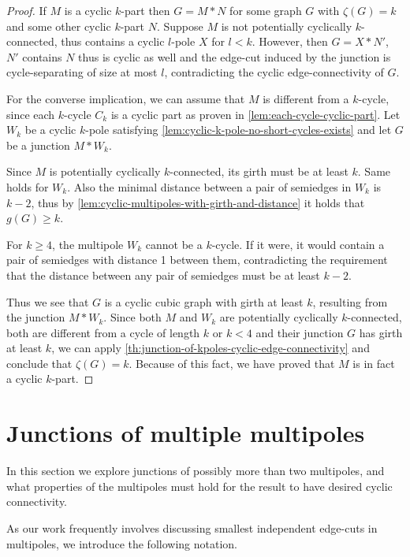\documentclass[12pt, twoside]{book}
\begin{document}
\begin{proof}
	If $M$ is a cyclic $k$-part then $G=M*N$ for some graph $G$ with $\zeta(G)=k$ and some other cyclic $k$-part $N$. Suppose $M$ is not potentially cyclically \mbox{$k$-connected}, thus contains a cyclic $l$-pole $X$ for $l<k$. However, then $G=X*N'$, $N'$ contains $N$ thus is cyclic as well and the edge-cut induced by the junction is cycle-separating of size at most $l$, contradicting the cyclic edge-connectivity of $G$.
	
	For the converse implication, we can assume that $M$ is different from a $k$-cycle, since each $k$-cycle $C_k$ is a cyclic part as proven in \cref{lem:each-cycle-cyclic-part}. Let $W_k$ be a cyclic $k$-pole satisfying \cref{lem:cyclic-k-pole-no-short-cycles-exists} and let $G$ be a junction $M*W_k$.
	
	Since $M$ is potentially cyclically $k$-connected, its girth must be at least $k$. Same holds for $W_k$. Also the minimal distance between a pair of semiedges in $W_k$ is $k-2$, thus by \cref{lem:cyclic-multipoles-with-girth-and-distance} it holds that $g(G)\geq k$.
	
	For $k\geq 4$, the multipole $W_k$ cannot be a $k$-cycle. If it were, it would contain a pair of semiedges with distance 1 between them, contradicting the requirement that the distance between any pair of semiedges must be at least $k-2$.
	
	Thus we see that $G$ is a cyclic cubic graph with girth at least $k$, resulting from the junction ${M*W_k}$. Since both $M$ and $W_k$ are potentially cyclically \mbox{$k$-connected}, both are different from a cycle of length $k$ or $k<4$ and their junction $G$ has girth at least $k$, we can apply \cref{th:junction-of-kpoles-cyclic-edge-connectivity} and conclude that $\zeta(G)=k$. Because of this fact, we have proved that $M$ is in fact a cyclic $k$-part.
\end{proof}

\section{Junctions of multiple multipoles}

In this section we explore junctions of possibly more than two multipoles, and what properties of the multipoles must hold for the result to have desired cyclic connectivity.

As our work frequently involves discussing smallest independent edge-cuts in multipoles, we introduce the following notation.
\end{document}
